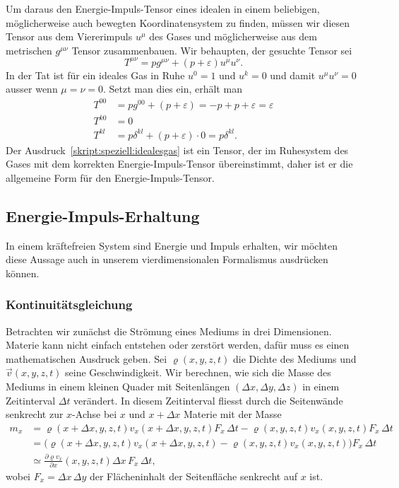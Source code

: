 Um daraus den Energie-Impuls-Tensor eines idealen in einem
beliebigen, möglicherweise auch bewegten Koordinatensystem zu
finden, müssen wir diesen Tensor aus dem Viererimpuls $u^\mu$
des Gases und möglicherweise aus dem metrischen $g^{\mu\nu}$ Tensor
zusammenbauen.
Wir behaupten, der gesuchte Tensor sei
\begin{equation}
T^{\mu\nu}
=
p g^{\mu\nu} + (p + \varepsilon)u^\mu u^\nu.
\label{skript:speziell:idealesgas}
\end{equation}
In der Tat ist für ein ideales Gas in Ruhe $u^0=1$ und $u^k=0$ und damit
$u^\mu u^\nu=0$ ausser wenn $\mu=\nu=0$.
Setzt man dies ein, erhält man
\begin{align*}
T^{00}
&=
pg^{00} + (p+\varepsilon) = -p+p+\varepsilon=\varepsilon
\\
T^{k0}
&=0
\\
T^{kl}
&=
p\delta^{kl}
+
(p+\varepsilon)\cdot 0
=
p\delta^{kl}.
\end{align*}
Der Ausdruck~\eqref{skript:speziell:idealesgas} ist ein Tensor, der
im Ruhesystem des Gases mit dem korrekten Energie-Impuls-Tensor
übereinstimmt,
daher ist er die allgemeine Form für den Energie-Impuls-Tensor.

\subsection{Energie-Impuls-Erhaltung}
%
In einem kräftefreien System sind Energie und Impuls erhalten, wir
möchten diese Aussage auch in unserem vierdimensionalen Formalismus
ausdrücken können.

\subsubsection{Kontinuitätsgleichung}
Betrachten wir zunächst die Strömung eines Mediums in drei Dimensionen.
Materie kann nicht einfach entstehen oder zerstört werden, dafür muss
es einen mathematischen Ausdruck geben.
Sei $\varrho(x,y,z,t)$ die Dichte des Mediums und $\vec v(x,y,z,t)$ 
seine Geschwindigkeit.
Wir berechnen, wie sich die Masse des Mediums in einem kleinen
Quader mit Seitenlängen $(\Delta x, \Delta y, \Delta z)$ in einem
Zeitinterval $\Delta t$ verändert.
In diesem Zeitinterval fliesst durch die Seitenwände senkrecht zur
$x$-Achse bei $x$ und $x+\Delta x$ 
Materie mit der Masse
\begin{align*}
m_x
&=
\varrho(x+\Delta x,y,z,t) v_x(x+\Delta x,y,z,t) F_x\,\Delta t
-\varrho(x,y,z,t) v_x(x,y,z,t) F_x\,\Delta t
\\
&=
\bigl(\varrho(x+\Delta x,y,z,t)
v_x(x+\Delta x,y,z,t) -\varrho(x,y,z,t) v_x(x,y,z,t)\bigr) F_x\,\Delta t
\\
&\simeq
\frac{\partial \varrho v_x}{\partial x}(x,y,z,t)\Delta x\, F_x\,\Delta t,
\end{align*}
wobei $F_x=\Delta x\,\Delta y$ der Flächeninhalt der Seitenfläche senkrecht
auf $x$ ist.

